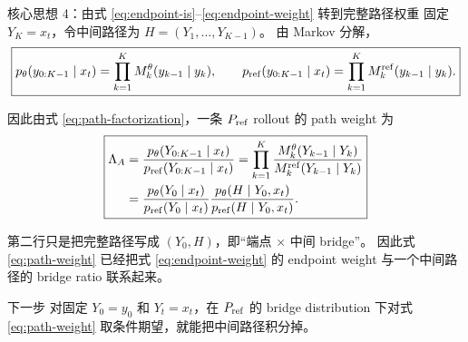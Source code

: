 \documentclass[10pt,aspectratio=169]{beamer}
\begin{document}
\begin{frame}{核心思想 4：由式 \eqref{eq:endpoint-is}--\eqref{eq:endpoint-weight} 转到完整路径权重}
\footnotesize
固定 $Y_K=x_t$，令中间路径为 $H=(Y_1,\ldots,Y_{K-1})$。
由 Markov 分解，
\begin{equation}
\boxed{
p_\theta(y_{0:K-1}\mid x_t)
=
\prod_{k=1}^{K}M_k^\theta(y_{k-1}\mid y_k),
\qquad
p_{\rm ref}(y_{0:K-1}\mid x_t)
=
\prod_{k=1}^{K}M_k^{\rm ref}(y_{k-1}\mid y_k).
}
\label{eq:path-factorization}
\end{equation}

因此由式 \eqref{eq:path-factorization}，一条 $P_{\rm ref}$ rollout 的 path weight 为
\begin{equation}
\boxed{
\begin{aligned}
\Lambda_A
&=
\frac{p_\theta(Y_{0:K-1}\mid x_t)}
     {p_{\rm ref}(Y_{0:K-1}\mid x_t)}
=
\prod_{k=1}^{K}
\frac{M_k^\theta(Y_{k-1}\mid Y_k)}
     {M_k^{\rm ref}(Y_{k-1}\mid Y_k)}
\\
&=
\frac{p_\theta(Y_0\mid x_t)}
     {p_{\rm ref}(Y_0\mid x_t)}
\frac{p_\theta(H\mid Y_0,x_t)}
     {p_{\rm ref}(H\mid Y_0,x_t)} .
\end{aligned}
}
\label{eq:path-weight}
\end{equation}

第二行只是把完整路径写成 $(Y_0,H)$，即“端点 $\times$ 中间 bridge”。
因此式 \eqref{eq:path-weight} 已经把式 \eqref{eq:endpoint-weight} 的 endpoint weight
与一个中间路径的 bridge ratio 联系起来。

\begin{block}{下一步}
对固定 $Y_0=y_0$ 和 $Y_t=x_t$，在 $P_{\rm ref}$ 的 bridge distribution
下对式 \eqref{eq:path-weight} 取条件期望，就能把中间路径积分掉。
\end{block}
\end{frame}
\end{document}
